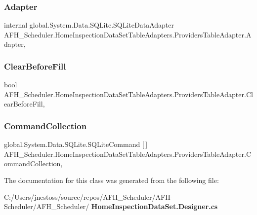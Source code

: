 \subsubsection{Adapter}
{\footnotesize\ttfamily internal global.\+System.\+Data.\+S\+Q\+Lite.\+S\+Q\+Lite\+Data\+Adapter A\+F\+H\+\_\+\+Scheduler.\+Home\+Inspection\+Data\+Set\+Table\+Adapters.\+Providers\+Table\+Adapter.\+Adapter\hspace{0.3cm}{\ttfamily [get]}, {\ttfamily [protected]}}

\mbox{\label{class_a_f_h___scheduler_1_1_home_inspection_data_set_table_adapters_1_1_providers_table_adapter_a1899ae5283cea5c6324a896f97af4890}} 
\subsubsection{ClearBeforeFill}
{\footnotesize\ttfamily bool A\+F\+H\+\_\+\+Scheduler.\+Home\+Inspection\+Data\+Set\+Table\+Adapters.\+Providers\+Table\+Adapter.\+Clear\+Before\+Fill\hspace{0.3cm}{\ttfamily [get]}, {\ttfamily [set]}}

\mbox{\label{class_a_f_h___scheduler_1_1_home_inspection_data_set_table_adapters_1_1_providers_table_adapter_a0d00ad719f4f7d20fc67661ef09367ff}} 
\subsubsection{CommandCollection}
{\footnotesize\ttfamily global.\+System.\+Data.\+S\+Q\+Lite.\+S\+Q\+Lite\+Command [$\,$] A\+F\+H\+\_\+\+Scheduler.\+Home\+Inspection\+Data\+Set\+Table\+Adapters.\+Providers\+Table\+Adapter.\+Command\+Collection\hspace{0.3cm}{\ttfamily [get]}, {\ttfamily [protected]}}



The documentation for this class was generated from the following file\+:\begin{DoxyCompactItemize}
\item 
C\+:/\+Users/jnestoss/source/repos/\+A\+F\+H\+\_\+\+Scheduler/\+A\+F\+H-\/\+Scheduler/\+A\+F\+H\+\_\+\+Scheduler/\textbf{ Home\+Inspection\+Data\+Set.\+Designer.\+cs}\end{DoxyCompactItemize}
